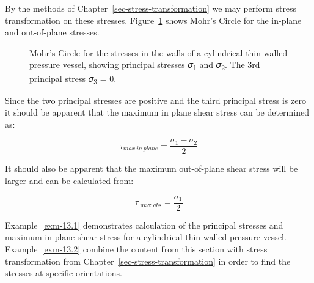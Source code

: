 \documentclass[
  letterpaper,
  DIV=11,
  numbers=noendperiod]{scrreprt}
\theoremstyle{definition}
\theoremstyle{remark}
\begin{document}
By the methods of Chapter~\ref{sec-stress-transformation} we may perform
stress transformation on these stresses. Figure~\ref{fig-13.6} shows
Mohr's Circle for the in-plane and out-of-plane stresses.

\begin{figure}


\caption{\label{fig-13.6}Mohr's Circle for the stresses in the walls of
a cylindrical thin-walled pressure vessel, showing principal stresses
𝜎\textsubscript{1} and 𝜎\textsubscript{2}. The 3rd principal stress
𝜎\textsubscript{3} = 0.}

\end{figure}%

Since the two principal stresses are positive and the third principal
stress is zero it should be apparent that the maximum in plane shear
stress can be determined as:

\[
\tau_{max~in~plane}=\frac{\sigma_1-\sigma_2}{2}
\]

It should also be apparent that the maximum out-of-plane shear stress
will be larger and can be calculated from:

\[
\tau_{\max a b s}=\frac{\sigma_1}{2}
\]

Example~\ref{exm-13.1} demonstrates calculation of the principal
stresses and maximum in-plane shear stress for a cylindrical thin-walled
pressure vessel. Example~\ref{exm-13.2} combine the content from this
section with stress transformation from
Chapter~\ref{sec-stress-transformation} in order to find the stresses at
specific orientations.
\end{document}
